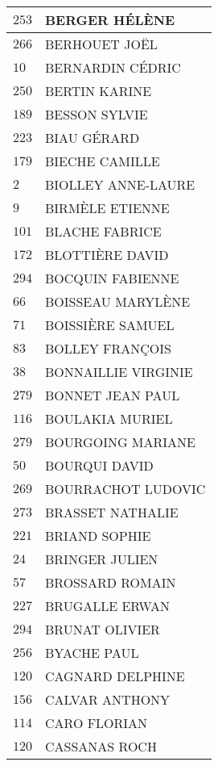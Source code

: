 \begin{xltabular}{\linewidth}{|l|X|}
    \hline
    $253$ & BERGER HÉLÈNE \\
    \hline
    $266$ & BERHOUET JOËL \\
    \hline
    $10$ & BERNARDIN CÉDRIC \\
    \hline
    $250$ & BERTIN KARINE \\
    \hline
    $189$ & BESSON SYLVIE \\
    \hline
    $223$ & BIAU GÉRARD \\
    \hline
    $179$ & BIECHE CAMILLE \\
    \hline
    $2$ & BIOLLEY ANNE-LAURE \\
    \hline
    $9$ & BIRMÈLE ETIENNE \\
    \hline
    $101$ & BLACHE FABRICE \\
    \hline
    $172$ & BLOTTIÈRE DAVID \\
    \hline
    $294$ & BOCQUIN FABIENNE \\
    \hline
    $66$ & BOISSEAU MARYLÈNE \\
    \hline
    $71$ & BOISSIÈRE SAMUEL \\
    \hline
    $83$ & BOLLEY FRANÇOIS \\
    \hline
    $38$ & BONNAILLIE VIRGINIE \\
    \hline
    $279$ & BONNET JEAN PAUL \\
    \hline
    $116$ & BOULAKIA MURIEL \\
    \hline
    $279$ & BOURGOING MARIANE \\
    \hline
    $50$ & BOURQUI DAVID \\
    \hline
    $269$ & BOURRACHOT LUDOVIC \\
    \hline
    $273$ & BRASSET NATHALIE \\
    \hline
    $221$ & BRIAND SOPHIE \\
    \hline
    $24$ & BRINGER JULIEN \\
    \hline
    $57$ & BROSSARD ROMAIN \\
    \hline
    $227$ & BRUGALLE ERWAN \\
    \hline
    $294$ & BRUNAT OLIVIER \\
    \hline
    $256$ & BYACHE PAUL \\
    \hline
    $120$ & CAGNARD DELPHINE \\
    \hline
    $156$ & CALVAR ANTHONY \\
    \hline
    $114$ & CARO FLORIAN \\
    \hline
    $120$ & CASSANAS ROCH \\

\end{xltabular}
